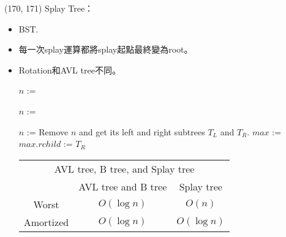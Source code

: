 \item \begin{theorem}{(170, 171)} Splay Tree： \label{splaytree}\begin{itemize}
        \item BST.
        \item 每一次splay運算都將splay起點最終變為root。
        \item Rotation和AVL tree不同。
        \begin{algorithm}[H]
            \begin{algorithmic}[1]
                    \State $n$ := 
                    \State {}
                \EndFunction
            \end{algorithmic}
        \end{algorithm}
        \begin{algorithm}[H]
            \begin{algorithmic}[1]
                    \State $n$ := 
                    \State {}
                \EndFunction
            \end{algorithmic}
        \end{algorithm}
        \begin{algorithm}[H]
            \begin{algorithmic}[1]
                    \State $n$ := 
                    \State {}
                    \State Remove $n$ and get its left and right subtrees $T_L$ and $T_R$.
                    \State $max$ := 
                    \State {}
                    \State $max.rchild$ := $T_R$
                \EndFunction
            \end{algorithmic}
        \end{algorithm}
        \begin{table}[H]
            \centering
            \begin{tabular}{|c|c|c|}
                \hline
                \multicolumn{3}{|c|}{AVL tree, B tree, and Splay tree} \\
                \Xhline{3\arrayrulewidth}
                & AVL tree and B tree & Splay tree \\
                \Xhline{2\arrayrulewidth}
                Worst & $O(\log n)$ & $O(n)$ \\
                \hline
                Amortized & $O(\log n)$ & $O(\log n)$ \\
                \hline
            \end{tabular}
        \end{table}
    \end{itemize}
\end{theorem}

